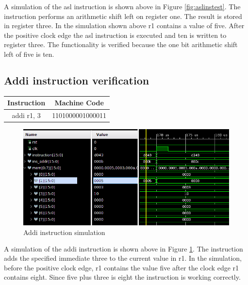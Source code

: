 \documentclass{article}
\begin{document}
		\begin{par}
			A simulation of the asl instruction is shown above in Figure \ref{fig:aslinstest}. The instruction performs an arithmetic shift left on register one. The result is stored in register three. In the simulation shown above r1 contains a value of five. After the positive clock edge the asl instruction is executed and ten is written to register three. The functionality is verified because the one bit arithmetic shift left of five is ten. 
		\end{par}
		\newpage
		
	\subsection{Addi instruction verification}
		\vspace{.5cm}
		\begin{center}
			\begin{tabular}{|c|c|}
				\hline 
				\textbf{Instruction} & \textbf{Machine Code} \\ 
				\hline 
				addi r1, 3 & 1101000001000011 \\ 
				\hline 
			\end{tabular} 
		\end{center}
		
		\begin{figure}[H]
			\centering
			\includegraphics[width=5in]{img/addiinstest.png}
			\caption{Addi instruction simulation}
			\label{fig:addiinstest}
		\end{figure}
		
		\begin{par}
			A simulation of the addi instruction is shown above in Figure \ref{fig:addiinstest}. The instruction adds the specified immediate three to the current value in r1. In the simulation, before the positive clock edge, r1 contains the value five after the clock edge r1 contains eight. Since five plus three is eight the instruction is working correctly. 
		\end{par}
		\newpage
\end{document}

